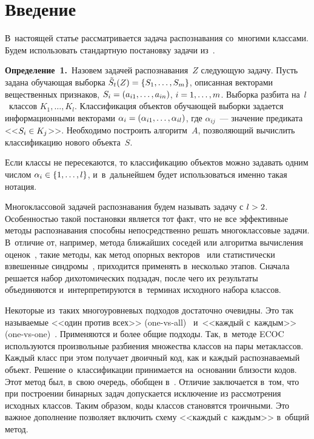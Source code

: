 



\thispagestyle{headings}

\begin{multicols}{2}

\label{st\stat}
  

\section{Введение}

В~настоящей статье рассматривается задача распознавания со~многими классами.
Будем использовать стандартную постановку задачи из~\cite{zhur1}.

\smallskip

\noindent
\textbf{Определение~1.}\
Назовем задачей распознавания~$Z$ следующую задачу.
Пусть задана обучающая выборка $\tilde{S}_t(Z)\hm=\{S_1,\ldots,S_m\}$, 
описанная векторами вещественных признаков, $S_i\hm=(a_{i1}, \ldots, a_{in})$, 
$i\hm=1,\ldots,m$.
Выборка разбита на~$l$~классов $K_1,\dots,K_l$.
Классификация объектов обучающей выборки задается 
информационными векторами ${\alpha_i}\hm=(\alpha_{i1}, \ldots, \alpha_{il})$, 
где $\alpha_{ij}$~--- значение предиката <<$S_i\hm\in K_j$>>.
Необходимо построить алгоритм~$A$, позволяющий вычислить классификацию нового 
объекта~$S$.

\smallskip

Если классы не пересекаются, то классификацию объектов можно 
задавать одним числом $\alpha_i\hm\in\{1,\ldots,l\}$, 
и~в~дальнейшем будет использоваться именно такая нотация.

Многоклассовой задачей распознавания будем называть задачу с $l\hm>2$.
Особенностью такой постановки является тот факт, что не все эффективные методы 
распознавания способны непосредственно решать многоклассовые задачи.
В~отличие от, например, метода ближайших соседей или алгоритма вычисления 
оценок~\cite{zhur1, zhur2}, такие методы, как метод опорных векторов~\cite{svm} 
или статистически взвешенные синдромы~\cite{sws}, приходится применять 
в~несколько этапов.
Сначала решается набор дихотомических подзадач, после чего их результаты 
объединяются и~интерпретируются в~терминах исходного набора классов.

Некоторые из~таких многоуровневых подходов достаточно очевидны.
Это так называемые <<один против всех>> (one-vs-all)~\cite{svm} 
и~<<каждый с~каждым>> (one-vs-one)~\cite{knerr}.
Применяются и более общие подходы.
Так, в~методе ECOC~\cite{Dietterich} используются произвольные разбиения 
множества классов на пары метаклассов.
Каждый класс при этом получает двоичный код, как и каждый распознаваемый объект.
Решение о~классификации принимается на~основании близости кодов.
Этот метод был, в~свою очередь, обобщен в~\cite{Allwein}.
Отличие заключается в~том, что при построении бинарных задач 
допускается исключение из рассмотрения исходных классов.
Таким образом, коды классов становятся троичными.
Это важное дополнение позволяет включить схему <<каждый с~каж\-дым>> в~общий метод.


\end{multicols}
